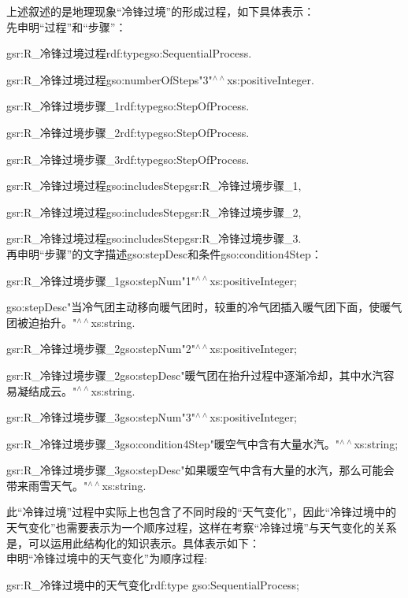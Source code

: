 上述叙述的是地理现象“冷锋过境”的形成过程，如下具体表示：\\
先申明“过程”和“步骤”：

gsr:R\_冷锋过境过程\quad rdf:type\quad \quad gso:SequentialProcess\quad .

gsr:R\_冷锋过境过程\quad gso:numberOfSteps\quad "3"$^{\land\land}$xs:positiveInteger\quad .

gsr:R\_冷锋过境步骤\_1\quad rdf:type\quad \quad gso:StepOfProcess\quad .

gsr:R\_冷锋过境步骤\_2\quad rdf:type\quad \quad gso:StepOfProcess\quad .

gsr:R\_冷锋过境步骤\_3\quad rdf:type\quad \quad gso:StepOfProcess\quad .

gsr:R\_冷锋过境过程\quad gso:includesStep\quad gsr:R\_冷锋过境步骤\_1\quad ,\quad 

gsr:R\_冷锋过境过程\quad gso:includesStep\quad gsr:R\_冷锋过境步骤\_2\quad ,\quad 

gsr:R\_冷锋过境过程\quad gso:includesStep\quad gsr:R\_冷锋过境步骤\_3\quad .
\\
再申明“步骤”的文字描述gso:stepDesc和条件gso:condition4Step：

gsr:R\_冷锋过境步骤\_1\quad gso:stepNum\quad "1"$^{\land\land}$xs:positiveInteger\quad ;

gso:stepDesc\quad "当冷气团主动移向暖气团时，较重的冷气团插入暖气团下面，使暖气团被迫抬升。"$^{\land\land}$xs:string\quad .

gsr:R\_冷锋过境步骤\_2\quad gso:stepNum\quad "2"$^{\land\land}$xs:positiveInteger\quad ;

gsr:R\_冷锋过境步骤\_2\quad gso:stepDesc\quad "暖气团在抬升过程中逐渐冷却，其中水汽容易凝结成云。"$^{\land\land}$xs:string\quad .

gsr:R\_冷锋过境步骤\_3\quad gso:stepNum\quad "3"$^{\land\land}$xs:positiveInteger\quad ;

gsr:R\_冷锋过境步骤\_3\quad gso:condition4Step\quad "暖空气中含有大量水汽。"$^{\land\land}$xs:string\quad ;

gsr:R\_冷锋过境步骤\_3\quad gso:stepDesc\quad "如果暖空气中含有大量的水汽，那么可能会带来雨雪天气。"$^{\land\land}$xs:string\quad .

此“冷锋过境”过程中实际上也包含了不同时段的“天气变化”，因此“冷锋过境中的天气变化”也需要表示为一个顺序过程，这样在考察“冷锋过境”与天气变化的关系是，可以运用此结构化的知识表示。具体表示如下：
\\
申明“冷锋过境中的天气变化”为顺序过程:

gsr:R\_冷锋过境中的天气变化\quad rdf:type \quad gso:SequentialProcess\quad ;


